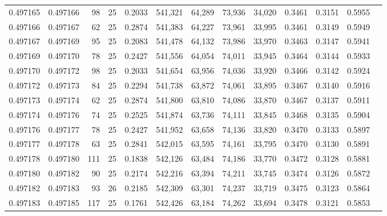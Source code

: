 \begin{tabular}{rrrrrrrrrrrrr}
0.497165 & 0.497166 &    98 &  25 &                                     0.2033 & 541,321 &  64,289 &  73,936 &  34,020 & 0.3461 & 0.3151 & 0.5955 \\
0.497166 & 0.497167 &    62 &  25 &                                     0.2874 & 541,383 &  64,227 &  73,961 &  33,995 & 0.3461 & 0.3149 & 0.5949 \\
0.497167 & 0.497169 &    95 &  25 &                                     0.2083 & 541,478 &  64,132 &  73,986 &  33,970 & 0.3463 & 0.3147 & 0.5941 \\
0.497169 & 0.497170 &    78 &  25 &                                     0.2427 & 541,556 &  64,054 &  74,011 &  33,945 & 0.3464 & 0.3144 & 0.5933 \\
0.497170 & 0.497172 &    98 &  25 &                                     0.2033 & 541,654 &  63,956 &  74,036 &  33,920 & 0.3466 & 0.3142 & 0.5924 \\
0.497172 & 0.497173 &    84 &  25 &                                     0.2294 & 541,738 &  63,872 &  74,061 &  33,895 & 0.3467 & 0.3140 & 0.5916 \\
0.497173 & 0.497174 &    62 &  25 &                                     0.2874 & 541,800 &  63,810 &  74,086 &  33,870 & 0.3467 & 0.3137 & 0.5911 \\
0.497174 & 0.497176 &    74 &  25 &                                     0.2525 & 541,874 &  63,736 &  74,111 &  33,845 & 0.3468 & 0.3135 & 0.5904 \\
0.497176 & 0.497177 &    78 &  25 &                                     0.2427 & 541,952 &  63,658 &  74,136 &  33,820 & 0.3470 & 0.3133 & 0.5897 \\
0.497177 & 0.497178 &    63 &  25 &                                     0.2841 & 542,015 &  63,595 &  74,161 &  33,795 & 0.3470 & 0.3130 & 0.5891 \\
0.497178 & 0.497180 &   111 &  25 &                                     0.1838 & 542,126 &  63,484 &  74,186 &  33,770 & 0.3472 & 0.3128 & 0.5881 \\
0.497180 & 0.497182 &    90 &  25 &                                     0.2174 & 542,216 &  63,394 &  74,211 &  33,745 & 0.3474 & 0.3126 & 0.5872 \\
0.497182 & 0.497183 &    93 &  26 &                                     0.2185 & 542,309 &  63,301 &  74,237 &  33,719 & 0.3475 & 0.3123 & 0.5864 \\
0.497183 & 0.497185 &   117 &  25 &                                     0.1761 & 542,426 &  63,184 &  74,262 &  33,694 & 0.3478 & 0.3121 & 0.5853 \\

\end{tabular}
